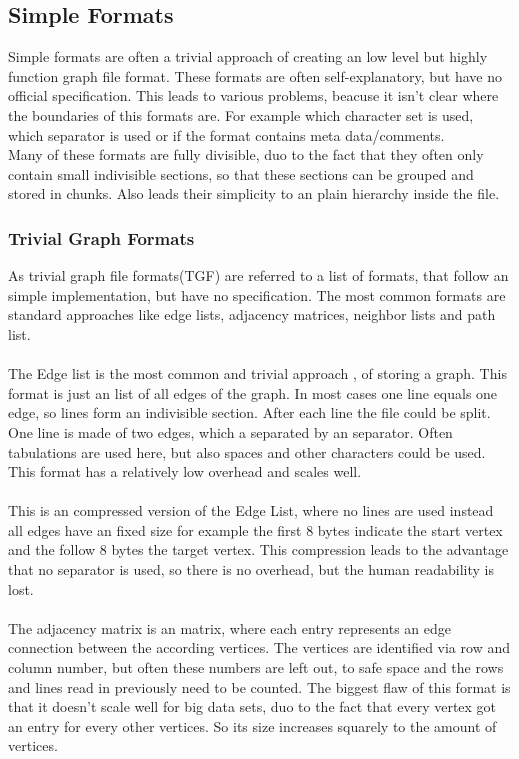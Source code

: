 \subsection{Simple Formats}
Simple formats are often a trivial approach of creating an low level but highly function graph file format. These formats are often self-explanatory, but have no official specification. This leads to various problems, beacuse it isn’t clear where the boundaries of this formats are. For example which character set is used, which separator is used or if the format contains meta data/comments\cite{Roughan.10.03.2015}.\\
Many of these formats are fully divisible, duo to the fact that they often only contain small indivisible sections, so that these sections can be grouped and stored in chunks. Also leads their simplicity to an plain hierarchy inside the file.

\subsubsection{Trivial Graph Formats}
As trivial graph file formats(TGF) are referred to a list of formats, that follow an simple implementation, but have no specification. The most common formats are standard approaches like edge lists, adjacency matrices, neighbor lists and path list.\\

\\
The Edge list is the most common and trivial approach , of storing a graph.
This format is just an list of all edges of the graph. In most cases one line equals one edge, so lines form an indivisible section. After each line the file could be split.
One line is made of two edges, which a separated by an separator. Often tabulations are used here, but also spaces and other characters could be used. This format has a relatively low overhead and scales well.\\

\\
This is an compressed version of the Edge List, where no lines are used instead all edges have an fixed size for example the first 8 bytes indicate the start vertex and the follow 8 bytes the target vertex. This compression leads to the advantage that no separator is used, so there is no overhead, but the human readability is lost.\\

\\
The adjacency matrix is an matrix, where each entry represents an edge connection between the according vertices. The vertices are identified via row and column number, but often these numbers are left out, to safe space and the rows and lines read in previously need to be counted. The biggest flaw of this format is that it doesn't scale well for big data sets, duo to the fact that every vertex got an entry for every other vertices. So its size increases squarely to the amount of vertices.\\

